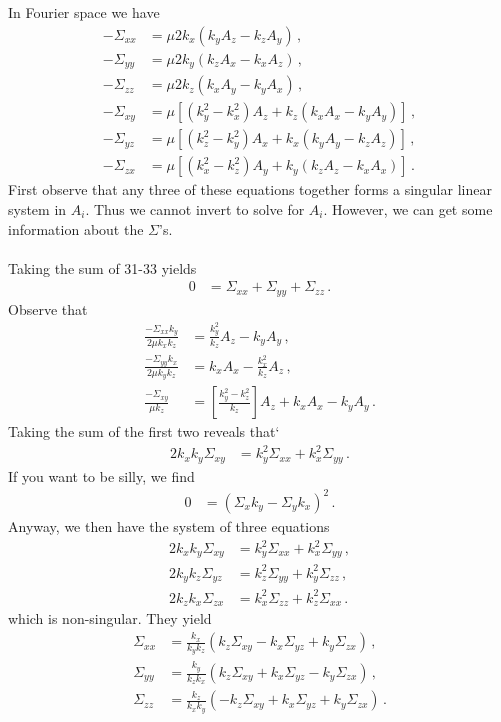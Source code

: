 \documentclass{article}
\newcommand*\p[1]{\left(#1\right)}
\newcommand*\ps[1]{\left[#1\right]}
\newcommand*\f[2]{\frac{#1}{#2}}
\begin{document}
\\\\
In Fourier space we have
\begin{align}
-\Sigma_{xx}&=\mu2k_x(k_y A_z-k_z A_y)\,,\\
-\Sigma_{yy}&=\mu2k_y(k_z A_x-k_x A_z)\,,\\
-\Sigma_{zz}&=\mu2k_z(k_x A_y-k_y A_x)\,,\\
-\Sigma_{xy}&=\mu\ps{(k_y^2-k_x^2) A_z+k_z(k_x A_x-k_y A_y)}\,,\\
-\Sigma_{yz}&=\mu\ps{(k_z^2-k_y^2) A_x+k_x(k_y A_y-k_z A_z)}\,,\\
-\Sigma_{zx}&=\mu\ps{(k_x^2-k_z^2) A_y+k_y(k_z A_z-k_x A_x)}\,.
\end{align}
First observe that any three of these equations together forms a singular linear system in $A_i$. Thus we cannot invert to solve for $A_i$. However, we can get some information about the $\Sigma$'s.
\\\\
Taking the sum of 31-33 yields
\begin{align}
0&=\Sigma_{xx}+\Sigma_{yy}+\Sigma_{zz}\,.
\end{align}
Observe that
\begin{align}
\f{-\Sigma_{xx}k_y}{2\mu k_xk_z}&=\f{k_y^2}{k_z}A_z-k_yA_y\,,\\
\f{-\Sigma_{yy}k_x}{2\mu k_yk_z}&=k_xA_x-\f{k_x^2}{k_z}A_z\,,\\
\f{-\Sigma_{xy}}{\mu k_z}&=\ps{\f{k_y^2-k_z^2}{k_z}}A_z+k_xA_x-k_yA_y\,.
\end{align}
Taking the sum of the first two reveals that`
\begin{align}
2k_xk_y\Sigma_{xy}&=k_y^2\Sigma_{xx}+k_x^2\Sigma_{yy}\,.
\end{align}
If you want to be silly, we find
\begin{align}
0&=(\Sigma_{x}k_y-\Sigma_{y}k_x)^2\,.
\end{align}
Anyway, we then have the system of three equations
\begin{align}
2k_xk_y\Sigma_{xy}&=k_y^2\Sigma_{xx}+k_x^2\Sigma_{yy}\,,\\
2k_yk_z\Sigma_{yz}&=k_z^2\Sigma_{yy}+k_y^2\Sigma_{zz}\,,\\
2k_zk_x\Sigma_{zx}&=k_x^2\Sigma_{zz}+k_z^2\Sigma_{xx}\,.
\end{align}
which is non-singular. They yield
\begin{align}
\Sigma_{xx}&=\f{k_x}{k_yk_z}\p{k_z\Sigma_{xy}-k_x\Sigma_{yz}+k_y\Sigma_{zx}}\,,\\
\Sigma_{yy}&=\f{k_y}{k_zk_x}\p{k_z\Sigma_{xy}+k_x\Sigma_{yz}-k_y\Sigma_{zx}}\,,\\
\Sigma_{zz}&=\f{k_z}{k_xk_y}\p{-k_z\Sigma_{xy}+k_x\Sigma_{yz}+k_y\Sigma_{zx}}\,.
\end{align}
\end{document}
